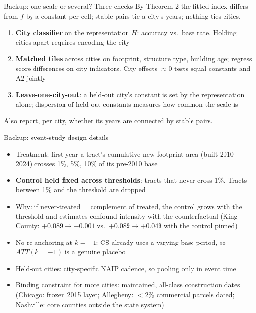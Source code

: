 \documentclass[10pt,aspectratio=169]{beamer}
\begin{document}
\begin{frame}{Backup: one scale or several? Three checks}
\footnotesize By Theorem 2 the fitted index differs from $f$ by a constant per cell; stable pairs tie a city's years; nothing ties cities.
\begin{enumerate}
  \item \textbf{City classifier} on the representation $H$: accuracy vs.\ base rate. Holding cities apart requires encoding the city
  \item \textbf{Matched tiles} across cities on footprint, structure type, building age; regress score differences on city indicators. City effects $\approx0$ tests equal constants and A2 jointly
  \item \textbf{Leave-one-city-out}: a held-out city's constant is set by the representation alone; dispersion of held-out constants measures how common the scale is
\end{enumerate}
Also report, per city, whether its years are connected by stable pairs.
\end{frame}

\begin{frame}{Backup: event-study design details}
\footnotesize
\begin{itemize}
  \item Treatment: first year a tract's cumulative new footprint area (built 2010–2024) crosses 1\%, 5\%, 10\% of its pre-2010 base
  \item \textbf{Control held fixed across thresholds}: tracts that never cross 1\%. Tracts between 1\% and the threshold are dropped
  \item Why: if never-treated = complement of treated, the control grows with the threshold and estimates confound intensity with the counterfactual (King County: $+0.089\to-0.001$ vs.\ $+0.089\to+0.049$ with the control pinned)
  \item No re-anchoring at $k=-1$: CS already uses a varying base period, so $ATT(k{=}-1)$ is a genuine placebo
  \item Held-out cities: city-specific NAIP cadence, so pooling only in event time
  \item Binding constraint for more cities: maintained, all-class construction dates (Chicago: frozen 2015 layer; Allegheny: $<$2\% commercial parcels dated; Nashville: core counties outside the state system)
\end{itemize}
\end{frame}
\end{document}
